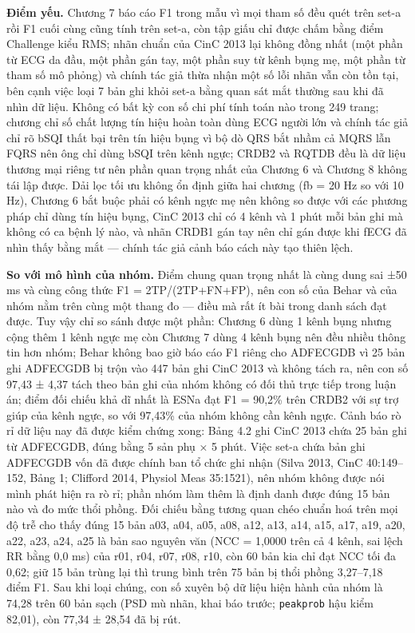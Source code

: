 \documentclass[12pt,a4paper]{article}
\begin{document}
\noindent \textbf{Điểm yếu.} Chương 7 báo cáo F1 trong mẫu vì mọi tham số đều quét trên set-a rồi F1 cuối cùng cũng tính trên set-a, còn tập giấu chỉ được chấm bằng điểm Challenge kiểu RMS; nhãn chuẩn của CinC 2013 lại không đồng nhất (một phần từ ECG da đầu, một phần gán tay, một phần suy từ kênh bụng mẹ, một phần từ tham số mô phỏng) và chính tác giả thừa nhận một số lỗi nhãn vẫn còn tồn tại, bên cạnh việc loại 7 bản ghi khỏi set-a bằng quan sát mắt thường sau khi đã nhìn dữ liệu. Không có bất kỳ con số chi phí tính toán nào trong 249 trang; chương chỉ số chất lượng tín hiệu hoàn toàn dùng ECG người lớn và chính tác giả chỉ rõ bSQI thất bại trên tín hiệu bụng vì bộ dò QRS bắt nhầm cả MQRS lẫn FQRS nên ông chỉ dùng bSQI trên kênh ngực; CRDB2 và RQTDB đều là dữ liệu thương mại riêng tư nên phần quan trọng nhất của Chương 6 và Chương 8 không tái lập được. Dải lọc tối ưu không ổn định giữa hai chương (fb = 20 Hz so với 10 Hz), Chương 6 bắt buộc phải có kênh ngực mẹ nên không so được với các phương pháp chỉ dùng tín hiệu bụng, CinC 2013 chỉ có 4 kênh và 1 phút mỗi bản ghi mà không có ca bệnh lý nào, và nhãn CRDB1 gán tay nên chỉ gán được khi fECG đã nhìn thấy bằng mắt — chính tác giả cảnh báo cách này tạo thiên lệch.\par\vspace{3pt}
\noindent \textbf{\color{tdtblue}So với mô hình của nhóm.} Điểm chung quan trọng nhất là cùng dung sai ±50 ms và cùng công thức F1 = 2TP/(2TP+FN+FP), nên con số của Behar và của nhóm nằm trên cùng một thang đo — điều mà rất ít bài trong danh sách đạt được. Tuy vậy chỉ so sánh được một phần: Chương 6 dùng 1 kênh bụng nhưng cộng thêm 1 kênh ngực mẹ còn Chương 7 dùng 4 kênh bụng nên đều nhiều thông tin hơn nhóm; Behar không bao giờ báo cáo F1 riêng cho ADFECGDB vì 25 bản ghi ADFECGDB bị trộn vào 447 bản ghi CinC 2013 và không tách ra, nên con số 97,43 ± 4,37 tách theo bản ghi của nhóm không có đối thủ trực tiếp trong luận án; điểm đối chiếu khả dĩ nhất là ESNa đạt F1 = 90,2\% trên CRDB2 với sự trợ giúp của kênh ngực, so với 97,43\% của nhóm không cần kênh ngực. Cảnh báo rò rỉ dữ liệu nay đã được kiểm chứng xong: Bảng 4.2 ghi CinC 2013 chứa 25 bản ghi từ ADFECGDB, đúng bằng 5 sản phụ × 5 phút. Việc set-a chứa bản ghi ADFECGDB vốn đã được chính ban tổ chức ghi nhận (Silva 2013, CinC 40:149–152, Bảng 1; Clifford 2014, Physiol Meas 35:1521), nên nhóm không được nói mình phát hiện ra rò rỉ; phần nhóm làm thêm là định danh được đúng 15 bản nào và đo mức thổi phồng. Đối chiếu bằng tương quan chéo chuẩn hoá trên mọi độ trễ cho thấy đúng 15 bản a03, a04, a05, a08, a12, a13, a14, a15, a17, a19, a20, a22, a23, a24, a25 là bản sao nguyên văn (NCC = 1,0000 trên cả 4 kênh, sai lệch RR bằng 0,0 ms) của r01, r04, r07, r08, r10, còn 60 bản kia chỉ đạt NCC tối đa 0,62; giữ 15 bản trùng lại thì trung bình trên 75 bản bị thổi phồng 3,27–7,18 điểm F1. Sau khi loại chúng, con số xuyên bộ dữ liệu hiện hành của nhóm là 74,28 trên 60 bản sạch (PSD mù nhãn, khai báo trước; \texttt{peakprob} hậu kiểm 82,01), còn 77,34 ± 28,54 đã bị rút.\par\vspace{3pt}
\end{document}
